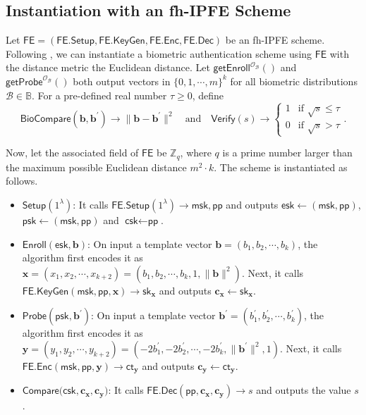 
\subsection{Instantiation with an fh-IPFE Scheme}
\label{sec:fh-IPFE-instantiation}

Let $\textsf{FE} = (\textsf{FE.Setup}, \textsf{FE.KeyGen}, \textsf{FE.Enc}, \textsf{FE.Dec})$ be an fh-IPFE scheme. Following \cite{cryptoeprint:2023/481}, we can instantiate a biometric authentication scheme using $\textsf{FE}$ with the distance metric the Euclidean distance.
Let $\textsf{getEnroll}^{\mathcal{O}_{\mathcal{B}}}()$ and $\textsf{getProbe}^{\mathcal{O}_{\mathcal{B}}}()$ both output vectors in $ \{0, 1, \cdots, m \}^k$ for all biometric distributions $\mathcal{B} \in \mathbb{B}$. 
For a pre-defined real number $\tau \geq 0$, define
\[
	\textsf{BioCompare}(\mathbf{b}, \mathbf{b}^\prime) \to \| \mathbf{b} - \mathbf{b}^\prime\|^2 \quad \text{and} \quad 
	\textsf{Verify}(s) \to 
	\begin{cases} 
		1 & \text{if } \sqrt{s} \leq \tau \\
		0 & \text{if } \sqrt{s} > \tau
	\end{cases}.
\]

Now, let the associated field of $\textsf{FE}$ be $\mathbb{Z}_q$, where $q$ is a prime number larger than the maximum possible Euclidean distance $m^2 \cdot k$. The scheme is instantiated as follows.

\begin{itemize}

	\item $\textsf{Setup}(1^\lambda)$: It calls $\textsf{FE.Setup}(1^\lambda) \to \textsf{msk}, \textsf{pp}$ and outputs $\textsf{esk} \gets (\textsf{msk}, \textsf{pp})$, $\textsf{psk} \gets (\textsf{msk}, \textsf{pp})$ and $\textsf{csk} \gets \textsf{pp}$.

	\item $\textsf{Enroll}(\textsf{esk}, \mathbf{b})$: On input a template vector $\mathbf{b} = (b_1, b_2, \cdots, b_k)$, the algorithm first encodes it as $\mathbf{x} = (x_1, x_2, \cdots, x_{k+2}) = (b_1, b_2, \cdots, b_k, 1, \|\mathbf{b}\|^2)$. Next, it calls $\textsf{FE.KeyGen}(\textsf{msk}, \textsf{pp}, \mathbf{x}) \to \textsf{sk}_{\mathbf{x}}$ and outputs $\mathbf{c_x} \gets \textsf{sk}_{\mathbf{x}}$.

	\item $\textsf{Probe}(\textsf{psk}, \mathbf{b}^\prime)$: On input a template vector $\mathbf{b}^\prime = (b_1^\prime, b_2^\prime, \cdots, b_k^\prime)$, the algorithm first encodes it as $\mathbf{y} = (y_1, y_2, \cdots, y_{k+2}) = (-2b_1^\prime, -2b_2^\prime, \cdots, -2b_k^\prime, \|\mathbf{b}^\prime\|^2, 1)$. Next, it calls $\textsf{FE.Enc}(\textsf{msk}, \textsf{pp}, \mathbf{y}) \to \textsf{ct}_{\mathbf{y}}$ and outputs $\mathbf{c_y} \gets \textsf{ct}_{\mathbf{y}}$.

	\item $\textsf{Compare}(\textsf{csk}, \mathbf{c_x}, \mathbf{c_y)}$: It calls $\textsf{FE.Dec}(\textsf{pp}, \mathbf{c_x}, \mathbf{c_y}) \to s$ and outputs the value $s$.

\end{itemize}

